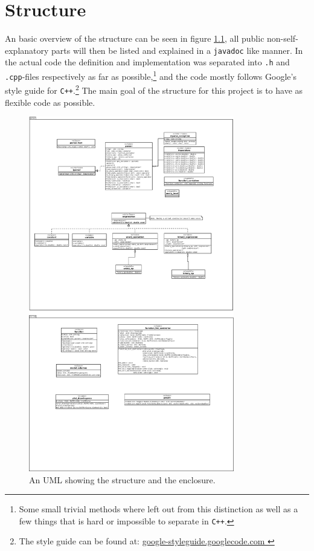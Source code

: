 \documentclass[a4paper,11pt]{kth-mag}
\newcommand{\Cpp}{\texttt{C++}}
\begin{document}
\chapter{Structure}
An basic overview of the structure can be seen in figure \ref{fig:UML}, all
public non-self-explanatory parts will then be listed and explained in 
a \verb+javadoc+ like manner. In the actual code the definition and
implementation was separated into \texttt{.h} and \texttt{.cpp}-files
respectively as far as possible,\footnote{Some small trivial methods where
left out from this distinction as well as a few things that is hard or
impossible to separate in \Cpp.} and the code mostly follows Google's
style guide for \Cpp.\footnote{The style guide can be found at:
\href{
    http://google-styleguide.googlecode.com/svn/trunk/cppguide.xml
    }{
    google-styleguide.googlecode.com
    }
} 
The main goal of the structure for this project is to have as flexible code as possible.
\begin{figure}[H]
\begin{center}
    \includegraphics[width=0.8\textwidth]{uml.pdf}
    \caption{\small{An UML showing the structure and the enclosure.}}\label{fig:UML}
\end{center}
\end{figure}
\end{document}
